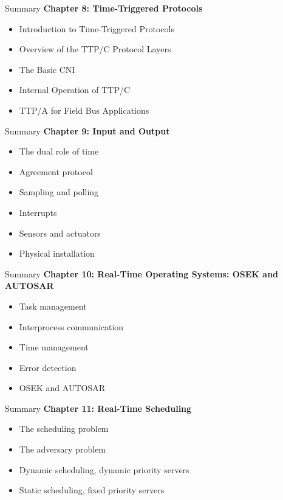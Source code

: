 \begin{frame}{Summary}
\textbf{Chapter 8: Time-Triggered Protocols}
\begin{itemize}
\item Introduction to Time-Triggered Protocols
\item Overview of the TTP/C Protocol Layers
\item The Basic CNI
\item Internal Operation of TTP/C
\item TTP/A for Field Bus Applications
\end{itemize}
\end{frame}

\begin{frame}{Summary}
\textbf{Chapter 9: Input and Output}
\begin{itemize}
\item The dual role of time
\item Agreement protocol
\item Sampling and polling
\item Interrupts
\item Sensors and actuators
\item Physical installation
\end{itemize}
\end{frame}

\begin{frame}{Summary}
\textbf{Chapter 10: Real-Time Operating Systems: OSEK and AUTOSAR}
\begin{itemize}
\item Task management
\item Interprocess communication
\item Time management
\item Error detection
\item OSEK and AUTOSAR
\end{itemize}
\end{frame}

\begin{frame}{Summary}
\textbf{Chapter 11: Real-Time Scheduling}
\begin{itemize}
\item The scheduling problem
\item The adversary problem
\item Dynamic scheduling, dynamic priority servers
\item Static scheduling, fixed priority servers
\end{itemize}
\end{frame}

